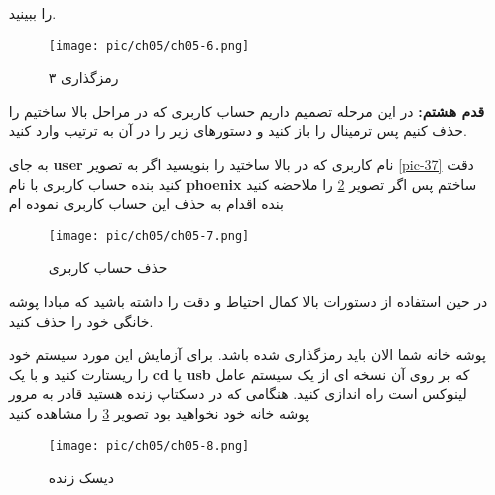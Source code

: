\begin{enumerate}
را ببینید.
	\begin{flushleft}
\end{flushleft}
\begin{figure}[H]%
	\caption{رمزگذاری ۳}
	\begin{center}
		\texttt{[image: pic/ch05/ch05-6.png]}
	\end{center}
	\label{pic-42}
\end{figure}
\item[\textbf{قدم هشتم:}] 
در این مرحله تصمیم داریم حساب کاربری که در مراحل بالا ساختیم را حذف کنیم پس ترمینال را باز کنید و دستورهای زیر را در آن به ترتیب وارد کنید.
		\begin{flushleft}
	\end{flushleft}
	\begin{flushleft}
	\xmybox[green]{\lr{sudo rm -rf /home/user/}}
\end{flushleft}
	\begin{flushleft}
\end{flushleft}
به جای
\textbf{user}
نام کاربری که در بالا ساختید را بنویسید اگر به تصویر 
\ref{pic-37}
دقت کنید بنده حساب کاربری با نام
\textbf{phoenix}
ساختم پس اگر تصویر
\ref{pic-43}
را ملاحضه کنید بنده اقدام به حذف این حساب کاربری نموده ام
\begin{figure}[H]%
	\caption{حذف حساب کاربری}
	\begin{center}
		\texttt{[image: pic/ch05/ch05-7.png]}
	\end{center}
	\label{pic-43}
\end{figure}
\begin{tcolorbox}[title=خطر حذف اطلاعات]
	در حین استفاده از دستورات بالا کمال احتیاط و دقت را داشته باشید که مبادا پوشه خانگی خود را حذف کنید.
\end{tcolorbox}
پوشه خانه شما الان باید رمزگذاری شده باشد. برای آزمایش این مورد سیستم خود را ریستارت کنید و با یک
\textbf{cd}
یا
\textbf{usb}
که بر روی آن نسخه ای از یک سیستم عامل لینوکس است راه اندازی کنید. هنگامی که در دسکتاپ زنده هستید قادر به مرور پوشه خانه خود نخواهید بود تصویر
\ref{pic-44}
را مشاهده کنید
\begin{figure}[H]%
	\caption{دیسک زنده}
	\begin{center}
		\texttt{[image: pic/ch05/ch05-8.png]}
	\end{center}
	\label{pic-44}
\end{figure}
\end{enumerate}
